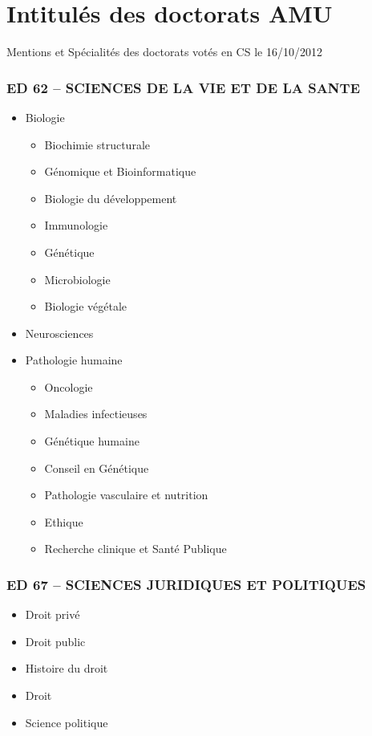 \section{Intitulés des doctorats AMU}

Mentions et Spécialités des doctorats votés en CS le 16/10/2012

\subsubsection*{ED 62 -- SCIENCES DE LA VIE ET DE LA SANTE}\label{ed-62-sciences-de-la-vie-et-de-la-sante}

\begin{itemize}
\item
Biologie
\begin{itemize}
\item Biochimie structurale
\item Génomique et Bioinformatique
\item Biologie du développement
\item Immunologie
\item Génétique
\item Microbiologie\
\item Biologie végétale
\end{itemize}
\item
Neurosciences
\item
Pathologie humaine
\begin{itemize}
\item Oncologie
\item Maladies infectieuses
\item Génétique humaine
\item Conseil en Génétique
\item Pathologie vasculaire et nutrition
\item Ethique
\item Recherche clinique et Santé Publique
\end{itemize}
\end{itemize}

\subsubsection*{ED 67 -- SCIENCES JURIDIQUES ET POLITIQUES}\label{ed-67-sciences-juridiques-et-politiques}

\begin{itemize}
\item
  Droit privé
\item
  Droit public
\item
  Histoire du droit
\item
  Droit
\item
  Science politique
\end{itemize}

